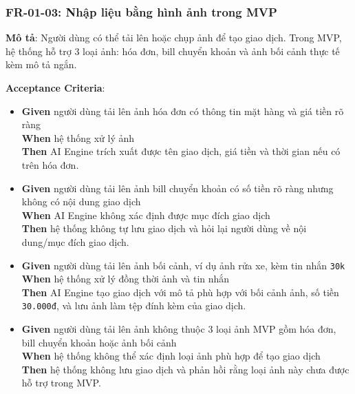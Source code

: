 \subsubsection{FR-01-03: Nhập liệu bằng hình ảnh trong MVP}

\textbf{Mô tả}: Người dùng có thể tải lên hoặc chụp ảnh để tạo giao dịch. Trong MVP, hệ thống hỗ trợ 3 loại ảnh: hóa đơn, bill chuyển khoản và ảnh bối cảnh thực tế kèm mô tả ngắn.



\textbf{Acceptance Criteria}:

\begin{itemize}
\item \textbf{Given} người dùng tải lên ảnh hóa đơn có thông tin mặt hàng và giá tiền rõ ràng  \\ \hspace*{1.5em}  \textbf{When} hệ thống xử lý ảnh  \\ \hspace*{1.5em}  \textbf{Then} AI Engine trích xuất được tên giao dịch, giá tiền và thời gian nếu có trên hóa đơn.
\item \textbf{Given} người dùng tải lên ảnh bill chuyển khoản có số tiền rõ ràng nhưng không có nội dung giao dịch  \\ \hspace*{1.5em}  \textbf{When} AI Engine không xác định được mục đích giao dịch  \\ \hspace*{1.5em}  \textbf{Then} hệ thống không tự lưu giao dịch và hỏi lại người dùng về nội dung/mục đích giao dịch.
\item \textbf{Given} người dùng tải lên ảnh bối cảnh, ví dụ ảnh rửa xe, kèm tin nhắn \texttt{30k}  \\ \hspace*{1.5em}  \textbf{When} hệ thống xử lý đồng thời ảnh và tin nhắn  \\ \hspace*{1.5em}  \textbf{Then} AI Engine tạo giao dịch với mô tả phù hợp với bối cảnh ảnh, số tiền \texttt{30.000đ}, và lưu ảnh làm tệp đính kèm của giao dịch.
\item \textbf{Given} người dùng tải lên ảnh không thuộc 3 loại ảnh MVP gồm hóa đơn, bill chuyển khoản hoặc ảnh bối cảnh  \\ \hspace*{1.5em}  \textbf{When} hệ thống không thể xác định loại ảnh phù hợp để tạo giao dịch  \\ \hspace*{1.5em}  \textbf{Then} hệ thống không lưu giao dịch và phản hồi rằng loại ảnh này chưa được hỗ trợ trong MVP.
\end{itemize}
